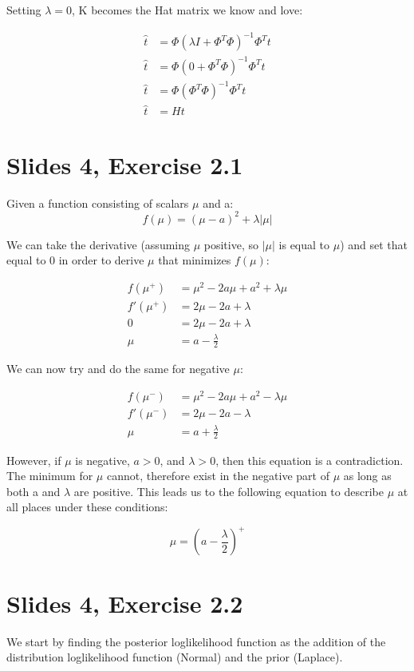 \documentclass[a4paper,12pt]{article}\usepackage[]{graphicx}\usepackage[]{color}
\begin{document}
Setting $\lambda = 0$, K becomes the Hat matrix we know and love:

\begin{align*}
\hat{t} &= \Phi(\lambda I + \Phi^T\Phi)^{-1}\Phi^Tt \\
\hat{t} &= \Phi(0 + \Phi^T\Phi)^{-1}\Phi^Tt \\
\hat{t} &= \Phi(\Phi^T\Phi)^{-1}\Phi^Tt \\
\hat{t} &= Ht
\end{align*}


\section{Slides 4, Exercise 2.1}

Given a function consisting of scalars $\mu$ and a:
$$
f(\mu) = (\mu - a)^2 + \lambda |\mu|
$$

We can take the derivative (assuming $\mu$ positive, so $|\mu|$ is equal to $\mu$) and set that equal to 0 in order to derive $\mu$ that minimizes $f(\mu)$:

\begin{align*}
f(\mu^+) &= \mu^2 - 2a\mu + a^2 + \lambda\mu \\
f'(\mu^+) &= 2\mu - 2a + \lambda \\
0 &= 2\mu - 2a + \lambda \\
\mu &= a - \frac{\lambda}{2}
\end{align*}

We can now try and do the same for negative $\mu$:

\begin{align*}
f(\mu^-) &= \mu^2 - 2a\mu + a^2 - \lambda\mu \\
f'(\mu^-) &= 2\mu - 2a - \lambda \\
\mu &= a + \frac{\lambda}{2}
\end{align*}

However, if $\mu$ is negative, $a > 0$, and $\lambda > 0$, then this equation is a contradiction. The minimum for $\mu$ cannot, therefore exist in the negative part of $\mu$ as long as both a and $\lambda$ are positive. This leads us to the following equation to describe $\mu$ at all places under these conditions:

$$
\mu = (a - \frac{\lambda}{2})^+
$$

\section{Slides 4, Exercise 2.2}
We start by finding the posterior loglikelihood function as the addition of the distribution loglikelihood function (Normal) and the prior (Laplace).
\end{document}
